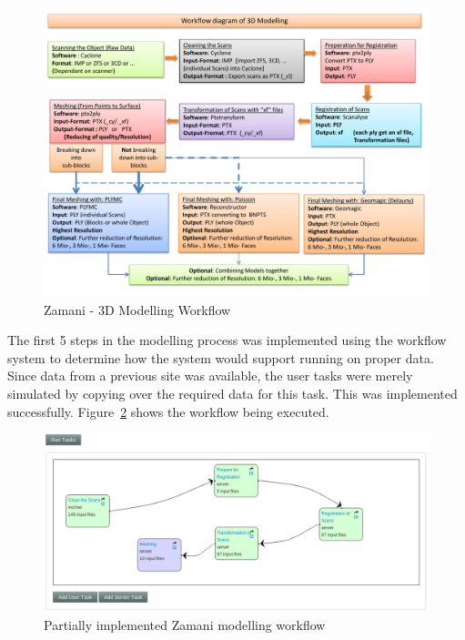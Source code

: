 \documentclass[12pt,a4paper]{report}
\begin{document}
\begin{figure}[!h]
    \begin{center}
        \includegraphics[scale=0.45]{figures/zamani_workflow.pdf}
    \end{center}
    \caption{Zamani - 3D Modelling Workflow}
    \label{eval:zamani}
\end{figure}
The first 5 steps in the modelling process was implemented using the workflow
system to determine how the system would support running on proper data. Since
data from a previous site was available, the user tasks were merely simulated
by copying over the required data for this task. This was implemented
successfully. Figure~\ref{eval:zamani_impl} shows the workflow being executed.

\begin{figure}[!h]
    \begin{center}
        \includegraphics[scale=0.45]{figures/zamani_impl.png}
    \end{center}
    \caption{Partially implemented Zamani modelling workflow}
    \label{eval:zamani_impl}
\end{figure}
\end{document}
